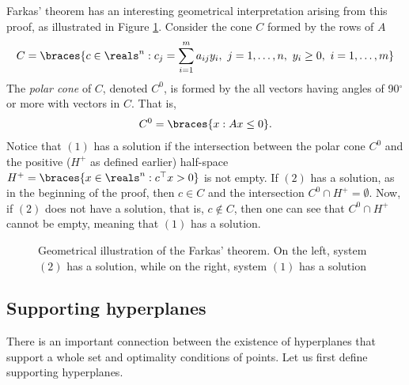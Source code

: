Farkas' theorem has an interesting geometrical interpretation arising from this proof, as illustrated in Figure \ref{fig:farkas}. Consider the cone $C$ formed by the rows of $A$
%
\begin{align*} 
	C = \braces{c \in \reals^n : c_j = \sum_{i=1}^m a_{ij} y_i, \ j= 1,\dots,n, \  y_i \geq 0, \ i =1,\dots, m}
\end{align*}
%
The \emph{polar cone} of $C$, denoted $C^0$, is formed by the all vectors having angles of 90$^\circ$ or more with vectors in $C$. That is, 
%
\begin{align*}
	C^0 = \braces{x : Ax \leq 0}.
\end{align*}
%
Notice that $(1)$ has a solution if the intersection between the polar cone $C^0$ and the positive ($H^+$ as defined earlier) half-space $H^+ = \braces{x \in \reals^n: c^\top x > 0}$ is not empty. If $(2)$ has a solution, as in the beginning of the proof, then $c \in C$ and the intersection $C^0 \cap H^+ = \emptyset$. Now, if $(2)$ does not have a solution, that is, $c \notin C$, then one can see that $C^0 \cap H^+$ cannot be empty, meaning that $(1)$ has a solution.  

\begin{figure}[h]
	\caption{Geometrical illustration of the Farkas' theorem. On the left, system $(2)$ has a solution, while on the right, system $(1)$ has a solution} \label{fig:farkas}
\end{figure}


\subsection{Supporting hyperplanes}

There is an important connection between the existence of hyperplanes that support a whole set and optimality conditions of points. Let us first define supporting hyperplanes. 

